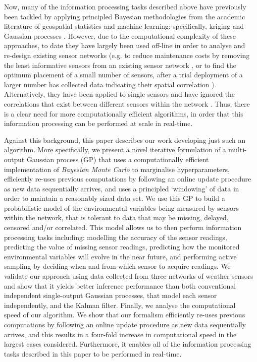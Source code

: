 \documentclass{acmtrans2m}
\begin{document}
Now, many of the information processing tasks described above have previously been tackled by applying principled Bayesian methodologies from the academic literature of geospatial statistics and machine learning: specifically, kriging \cite{cressie} and Gaussian processes \cite{GPsBook}. However, due to the computational complexity of these approaches, to date they have largely been used off-line in order to analyse and re-design existing sensor networks (e.g. to reduce maintenance costs by removing the least informative sensors from an existing sensor network \cite{fuentes}, or to find the optimum placement of a small number of sensors, after a trial deployment of a larger number has collected data indicating their spatial correlation \cite{guestrin1}). Alternatively, they have been applied to single sensors and have ignored the correlations that exist between different sensors within the network \cite{1525857,usac}. Thus, there is a clear need for more computationally efficient algorithms, in order that this information processing can be performed at scale in real-time.

Against this background, this paper describes our work developing just such an algorithm. More specifically, we present a novel iterative formulation of a multi-output Gaussian process (GP) that uses a computationally efficient implementation of {\em Bayesian Monte Carlo} to marginalise hyperparameters, efficiently re-uses previous computations by following an online update procedure as new data sequentially arrives, and uses a principled `windowing' of data in order to maintain a reasonably sized data set. We use this GP to build a probabilistic model of the environmental variables being measured by sensors within the network, that is tolerant to data that may be missing, delayed, censored and/or correlated. This model allows us to then perform information processing tasks including: modelling the accuracy of the sensor readings, predicting the value of missing sensor readings, predicting how the monitored environmental variables will evolve in the near future, and performing active sampling by deciding when and from which sensor to acquire readings. We validate our approach using data collected from three networks of weather sensors and show that it yields better inference performance than both conventional independent single-output Gaussian processes, that model each sensor independently, and the Kalman filter. Finally, we analyse the computational speed of our algorithm. We show that our formalism efficiently re-uses previous computations by following an online update procedure as new data sequentially arrives, and this results in a four-fold increase in computational speed in the largest cases considered. Furthermore, it enables all of the information processing tasks described in this paper to be performed in real-time.
\end{document}
